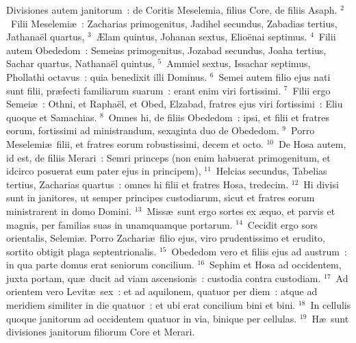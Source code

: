 \lettrine[lines=3,image=true,loversize=0.05,lraise=-0.03]{D}{}ivisiones autem janitorum~: de Coritis Meselemia, filius Core, de filiis Asaph.
${}^{2}$~Filii Meselemi\ae~: Zacharias primogenitus, Jadihel secundus, Zabadias tertius, Jathana\"el quartus,
${}^{3}$~\AE lam quintus, Johanan sextus, Elio\"enai septimus.
${}^{4}$~Filii autem Obededom~: Semeias primogenitus, Jozabad secundus, Joaha tertius, Sachar quartus, Nathana\"el quintus,
${}^{5}$~Ammiel sextus, Issachar septimus, Phollathi octavus~: quia benedixit illi Dominus.
${}^{6}$~Semei autem filio ejus nati sunt filii, pr\ae fecti familiarum suarum~: erant enim viri fortissimi.
${}^{7}$~Filii ergo Semei\ae~: Othni, et Rapha\"el, et Obed, Elzabad, fratres ejus viri fortissimi~: Eliu quoque et Samachias.
${}^{8}$~Omnes hi, de filiis Obededom~: ipsi, et filii et fratres eorum, fortissimi ad ministrandum, sexaginta duo de Obededom.
${}^{9}$~Porro Meselemi\ae\ filii, et fratres eorum robustissimi, decem et octo.
${}^{10}$~De Hosa autem, id est, de filiis Merari~: Semri princeps (non enim habuerat primogenitum, et idcirco posuerat eum pater ejus in principem),
${}^{11}$~Helcias secundus, Tabelias tertius, Zacharias quartus~: omnes hi filii et fratres Hosa, tredecim.
${}^{12}$~Hi divisi sunt in janitores, ut semper principes custodiarum, sicut et fratres eorum ministrarent in domo Domini.
${}^{13}$~Miss\ae\ sunt ergo sortes ex \ae quo, et parvis et magnis, per familias suas in unamquamque portarum.
${}^{14}$~Cecidit ergo sors orientalis, Selemi\ae . Porro Zachari\ae\ filio ejus, viro prudentissimo et erudito, sortito obtigit plaga septentrionalis.
${}^{15}$~Obededom vero et filiis ejus ad austrum~: in qua parte domus erat seniorum concilium.
${}^{16}$~Sephim et Hosa ad occidentem, juxta portam, qu\ae\ ducit ad viam ascensionis~: custodia contra custodiam.
${}^{17}$~Ad orientem vero Levit\ae\ sex~: et ad aquilonem, quatuor per diem~: atque ad meridiem similiter in die quatuor~: et ubi erat concilium bini et bini.
${}^{18}$~In cellulis quoque janitorum ad occidentem quatuor in via, binique per cellulas.
${}^{19}$~H\ae\ sunt divisiones janitorum filiorum Core et Merari.


